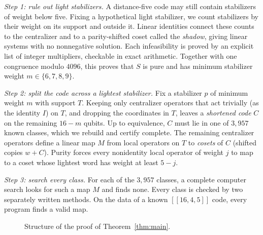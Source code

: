 \documentclass[11pt]{article}
\theoremstyle{definition}
\theoremstyle{remark}
\newcommand{\qc}[1]{[\![#1]\!]}
\begin{document}
\emph{Step 1: rule out light stabilizers.} A distance-five code may
still contain stabilizers of weight below five. Fixing a hypothetical
light stabilizer, we count stabilizers by their weight on its support
and outside it. Linear identities connect these counts to the
centralizer and to a parity-shifted coset called the \emph{shadow}, giving
linear systems with no nonnegative solution. Each infeasibility is
proved by an explicit list of integer multipliers, checkable in exact
arithmetic. Together with one congruence modulo \(4096\), this proves
that \(S\) is pure and has minimum stabilizer weight
\(m\in\{6,7,8,9\}\).

\emph{Step 2: split the code across a lightest stabilizer.} Fix a
stabilizer \(p\) of minimum weight \(m\) with support \(T\). Keeping
only centralizer operators that act trivially (as the identity \(I\)) on
\(T\), and dropping the coordinates in \(T\), leaves a \emph{shortened
code} \(C\) on the remaining \(16-m\) qubits. Up to equivalence, \(C\)
must lie in one of \(3{,}957\) known classes, which we rebuild and
certify complete. The remaining centralizer operators define a linear
map \(M\) from local operators on \(T\) to \emph{cosets} of \(C\)
(shifted copies \(w+C\)). Purity forces every nonidentity local operator
of weight \(j\) to map to a coset whose lightest word has weight at
least \(5-j\).

\emph{Step 3: search every class.} For each of the \(3{,}957\) classes,
a complete computer search looks for such a map \(M\) and finds none.
Every class is checked by two separately written methods. On the data of
a known \(\qc{16,4,5}\) code, every program finds a valid map.

\begin{figure}[htbp]
\centering
{}
\caption{Structure of the proof of Theorem~\ref{thm:main}.}
\label{fig:flow}
\end{figure}
\end{document}
